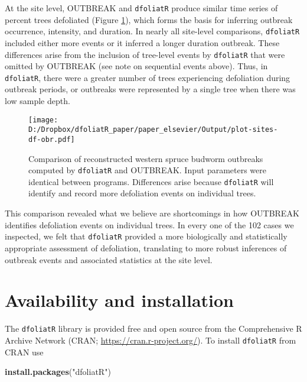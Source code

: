 \documentclass[review]{elsarticle} %
\makeatletter
\newenvironment{Shaded}{\begin{snugshade}}{\end{snugshade}}
\newcommand{\KeywordTok}[1]{\textcolor[rgb]{0.13,0.29,0.53}{\textbf{#1}}}
\newcommand{\NormalTok}[1]{#1}
\newcommand{\StringTok}[1]{\textcolor[rgb]{0.31,0.60,0.02}{#1}}
\def\maxwidth{\ifdim\Gin@nat@width>\linewidth\linewidth
\else\Gin@nat@width\fi}
\let\Oldincludegraphics\includegraphics
\renewcommand{\includegraphics}[1]{\Oldincludegraphics[width=\maxwidth]{#1}}
\makeatother
\begin{document}
At the site level, OUTBREAK and \texttt{dfoliatR} produce similar time series of percent trees defoliated (Figure \ref{fig:fig-df-obr}), which forms the basis for inferring outbreak occurrence, intensity, and duration. In nearly all site-level comparisons, \texttt{dfoliatR} included either more events or it inferred a longer duration outbreak. These differences arise from the inclusion of tree-level events by \texttt{dfoliatR} that were omitted by OUTBREAK (see note on sequential events above). Thus, in \texttt{dfoliatR}, there were a greater number of trees experiencing defoliation during outbreak periods, or outbreaks were represented by a single tree when
there was low sample depth.



\begin{figure}
\centering
\texttt{[image: D:/Dropbox/dfoliatR\_paper/paper\_elsevier/Output/plot-sites-df-obr.pdf]}
\caption{\label{fig:fig-df-obr}Comparison of reconstructed western spruce budworm outbreaks computed by \texttt{dfoliatR} and OUTBREAK. Input parameters were identical between programs. Differences arise because \texttt{dfoliatR} will identify and record more defoliation events on individual trees.}
\end{figure}

This comparison revealed what we believe are shortcomings in how OUTBREAK identifies defoliation events on individual trees. In every one of the 102 cases we inspected, we felt that \texttt{dfoliatR} provided a more biologically and statistically appropriate assessment of defoliation, translating to more robust inferences of outbreak events and associated statistics at the site level.

\hypertarget{availability-and-installation}{%
\section{Availability and installation}\label{availability-and-installation}}

The \texttt{dfoliatR} library is provided free and open source from the Comprehensive R Archive Network (CRAN; \url{https://cran.r-project.org/}). To install \texttt{dfoliatR} from CRAN use

\begin{Shaded}
\begin{Highlighting}[]
\KeywordTok{install.packages}\NormalTok{(}\StringTok{"dfoliatR"}\NormalTok{)}
\end{Highlighting}
\end{Shaded}
\end{document}
